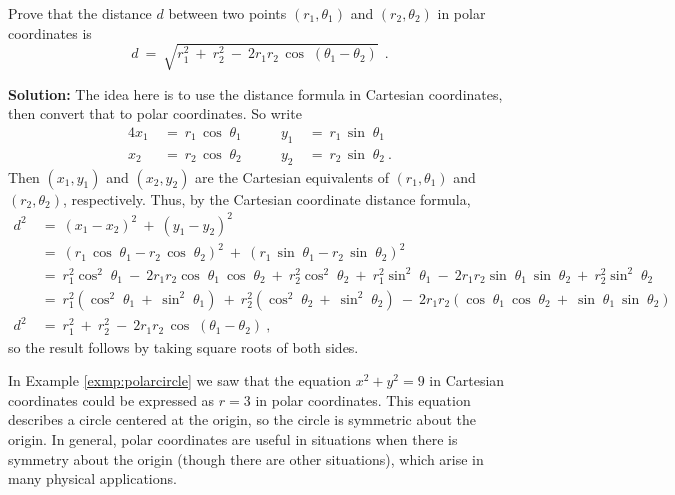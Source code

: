 \begin{exmp}
 Prove that the distance $d$ between two points $(r_1 , \theta_1)$ and $(r_2 , \theta_2)$ in polar
 coordinates is
 \begin{equation}\label{eqn:polardist}
  d ~=~ \sqrt{r_1^2 ~+~ r_2^2 ~-~ 2r_1r_2\,\cos\;(\theta_1 - \theta_2)} ~~.
 \end{equation}
 \par\noindent\textbf{Solution:} The idea here is to use the distance formula in Cartesian coordinates,
 then convert that to polar coordinates. So write
 \begin{alignat*}{4}
  x_1 ~&=~ r_1 \,\cos\;\theta_1 \qquad& y_1 ~&=~ r_1 \,\sin\;\theta_1\\
  x_2 ~&=~ r_2 \,\cos\;\theta_2 \qquad& y_2 ~&=~ r_2 \,\sin\;\theta_2 ~.
 \end{alignat*}
 Then $(x_1,y_1)$ and $(x_2,y_2)$ are the Cartesian equivalents of $(r_1 , \theta_1)$ and $(r_2 , \theta_2)$,
 respectively. Thus, by the Cartesian coordinate distance formula,
 \begin{align*}
  d^2 ~&=~ (x_1 - x_2)^2 ~+~ (y_1 - y_2)^2\\
  &=~ (r_1 \,\cos\;\theta_1 - r_2 \,\cos\;\theta_2)^2 ~+~ (r_1 \,\sin\;\theta_1 - r_2 \,\sin\;\theta_2)^2\\
  &=~ r_1^2 \cos^2\;\theta_1 ~-~ 2r_1 r_2 \cos\;\theta_1~\cos\;\theta_2 ~+~ r_2^2 \cos^2\;\theta_2 ~+~
   r_1^2 \sin^2\;\theta_1 ~-~ 2r_1 r_2 \sin\;\theta_1~\sin\;\theta_2 ~+~ r_2^2 \sin^2\;\theta_2\\
  &=~ r_1^2 (\cos^2\;\theta_1 ~+~ \sin^2\;\theta_1) ~+~ r_2^2 (\cos^2\;\theta_2 ~+~ \sin^2\;\theta_2) ~-~
   2r_1 r_2 (\cos\;\theta_1~\cos\;\theta_2 ~+~ \sin\;\theta_1~\sin\;\theta_2)\\
  d^2 ~&=~ r_1^2 ~+~ r_2^2 ~-~ 2r_1r_2\,\cos\;(\theta_1 - \theta_2) ~,
 \end{align*}
 so the result follows by taking square roots of both sides.
\end{exmp}\vspace{-1mm}
\divider
\vspace{2mm}

In Example \ref{exmp:polarcircle} we saw that the equation $x^2 + y^2 = 9$ in Cartesian coordinates
could be expressed as $r = 3$ in polar coordinates. This equation describes a circle centered at the
origin, so the circle is symmetric about the origin. In general, polar coordinates are useful in
situations when there is symmetry about the origin (though there are other situations), which arise
in many physical applications.

